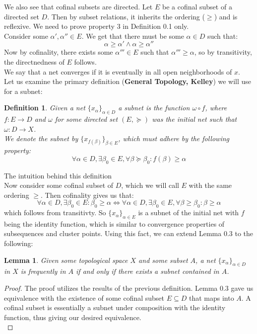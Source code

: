 \documentclass[10pt,letterpaper]{article} %
\newtheorem{lem}{Lemma}[section]
\newtheorem{defn}{Definition}[section]
\begin{document}
We also see that cofinal subsets are directed. Let $E$ be a cofinal subset of a directed set $D$. Then by subset relations, it inherits the ordering ($\geq$) and is reflexive. We need to prove property 3 in Definition 0.1 only.\\

Consider some $\alpha', \alpha'' \in E$. We get that there must be some $\alpha \in D$ such that:
\begin{equation*}
\alpha \geq \alpha' \land \alpha \geq \alpha''
\end{equation*}
Now by cofinality, there exists some $\alpha''' \in E$ such that $\alpha''' \geq \alpha$, so by transitivity, the directnedness of $E$ follows.\\

We say that a net converges if it is eventually in all open neighborhoods of $x$.\\

Let us examine the primary definition (\textbf{General Topology, Kelley}) we will use for a subnet:
\begin{defn}
Given a net $\{x_\alpha\}_{\alpha \in D}$ a subnet is the function $\omega \circ f$, where $f: E \xrightarrow{} D$ and $\omega$ for some directed set $(E, \succcurlyeq)$ was the initial net such that $\omega: D \xrightarrow{} X$.\\

We denote the subnet by $\{x_{f(\beta)}\}_{\beta \in E}$, which must adhere by the following property:
\begin{equation*}
\forall \alpha \in D, \exists \beta_0 \in E, \forall \beta \succcurlyeq \beta_0: f(\beta) \geq \alpha
\end{equation*}
\end{defn}
The intuition behind this definition\\

Now consider some cofinal subset of $D$, which we will call $E$ with the same ordering $\geq$. Then cofinality gives us that:
\begin{equation*}
\forall \alpha \in D, \exists \beta_0 \in E: \beta_0 \geq \alpha \iff \forall \alpha \in D, \exists \beta_0 \in E, \forall \beta \geq \beta_0: \beta \geq \alpha
\end{equation*}
which follows from transitivty. So $\{x_\alpha\}_{\alpha \in E}$ is a subnet of the initial net with $f$ being the identity function, which is similar to convergence properties of subsequences and cluster points. Using this fact, we can extend Lemma 0.3 to the following:
\begin{lem}
Given some topological space $X$ and some subset $A$, a net $\{x_\alpha\}_{\alpha \in D}$ in $X$ is frequently in $A$ if and only if there exists a subnet contained in $A$.   
\end{lem}
\begin{proof}
The proof utilizes the results of the previous definition. Lemma 0.3 gave us equivalence with the existence of some cofinal subset $E \subseteq D$ that maps into $A$. A cofinal subset is essentially a subnet under composition with the identity function, thus giving our desired equivalence.\\
\end{proof}
\end{document}
